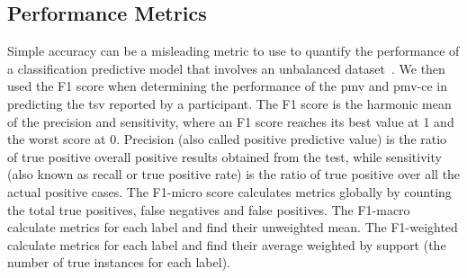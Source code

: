 \subsection{Performance Metrics}\label{subsec:performance-metrics}
Simple accuracy can be a misleading metric to use to quantify the performance of a classification predictive model that involves an unbalanced dataset~\cite{Chawla2005}.
We then used the F1 score when determining the performance of the \ac{pmv} and \ac{pmv-ce} in predicting the \ac{tsv} reported by a participant.
The F1 score is the harmonic mean of the precision and sensitivity, where an F1 score reaches its best value at 1 and the worst score at 0.
Precision (also called positive predictive value) is the ratio of true positive overall positive results obtained from the test, while sensitivity (also known as recall or true positive rate) is the ratio of true positive over all the actual positive cases.
The F1-micro score calculates metrics globally by counting the total true positives, false negatives and false positives.
The F1-macro calculate metrics for each label and find their unweighted mean.
The F1-weighted calculate metrics for each label and find their average weighted by support (the number of true instances for each label).
